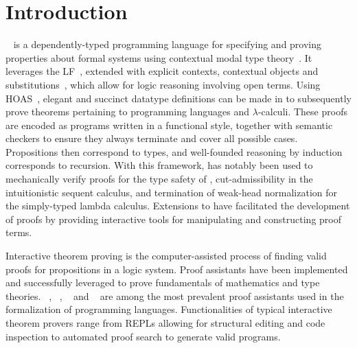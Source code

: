 \chapter{Introduction}\label{chapter:introduction}






\Beluga~\cite{pientka2010beluga} is a dependently-typed programming language for specifying and proving properties about formal systems using contextual modal type theory~\cite{nanevski2008contextual}.
It leverages the \acf{LF}~\cite{harper1993framework}, extended with explicit contexts, contextual objects and substitutions~\cite{DBLP:journals/corr/abs-1009-2789, cave2013first}, which allow for logic reasoning involving open terms.
Using \ac{HOAS}~\cite{pfenning1988higher}, elegant and succinct datatype definitions can be made in \LF to subsequently prove theorems pertaining to programming languages and $ \lambda $-calculi.
These proofs are encoded as programs written in a functional style, together with semantic checkers to ensure they always terminate and cover all possible cases.
Propositions then correspond to types, and well-founded reasoning by induction corresponds to recursion.
With this framework, \Beluga has notably been used to mechanically verify proofs for the type safety of \SystemF, cut-admissibility in the intuitionistic sequent calculus, and termination of weak-head normalization for the simply-typed lambda calculus.
Extensions to \Beluga have facilitated the development of proofs by providing interactive tools for manipulating and constructing proof terms.



Interactive theorem proving is the computer-assisted process of finding valid proofs for propositions in a logic system.
Proof assistants have been implemented and successfully leveraged to prove fundamentals of mathematics and type theories.
\Agda~\cite{clffolp, norell2007towards, agda2023}, \Coq~\cite{Coq, bertot2013interactive}, \Isabelle~\cite{nipkow2002isabelle} and \Lean~\cite{lean4} are among the most prevalent proof assistants used in the formalization of programming languages.
Functionalities of typical interactive theorem provers range from \acp{REPL} allowing for structural editing and code inspection to automated proof search to generate valid programs.

